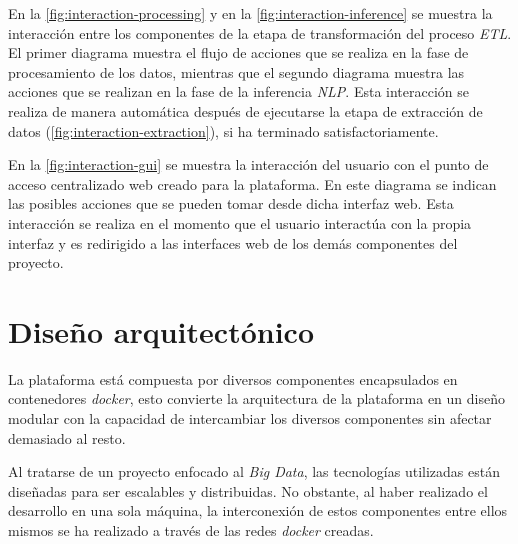 
En la \autoref{fig:interaction-processing} y en la \autoref{fig:interaction-inference} se muestra la interacción entre los componentes de la etapa de transformación del proceso \textit{ETL}. El primer diagrama muestra el flujo de acciones que se realiza en la fase de procesamiento de los datos, mientras que el segundo diagrama muestra las acciones que se realizan en la fase de la inferencia \textit{NLP}. Esta interacción se realiza de manera automática después de ejecutarse la etapa de extracción de datos (\autoref{fig:interaction-extraction}), si ha terminado satisfactoriamente.



En la \autoref{fig:interaction-gui} se muestra la interacción del usuario con el punto de acceso centralizado web creado para la plataforma. En este diagrama se indican las posibles acciones que se pueden tomar desde dicha interfaz web. Esta interacción se realiza en el momento que el usuario interactúa con la propia interfaz y es redirigido a las interfaces web de los demás componentes del proyecto.


\section{Diseño arquitectónico}

La plataforma está compuesta por diversos componentes encapsulados en contenedores \textit{docker}, esto convierte la arquitectura de la plataforma en un diseño modular con la capacidad de intercambiar los diversos componentes sin afectar demasiado al resto.

Al tratarse de un proyecto enfocado al \textit{Big Data}, las tecnologías utilizadas están diseñadas para ser escalables y distribuidas. No obstante, al haber realizado el desarrollo en una sola máquina, la interconexión de estos componentes entre ellos mismos se ha realizado a través de las redes \textit{docker} creadas.

